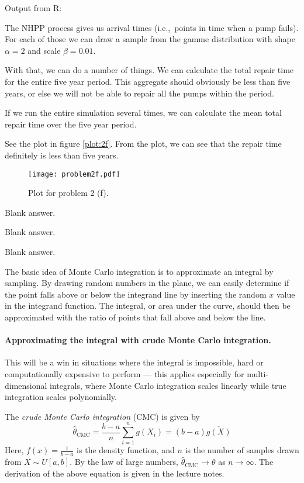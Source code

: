 \documentclass[a4paper,english,12pt]{article}
\begin{document}
Output from R:

The NHPP process gives us arrival times (i.e.,~points in time when a pump
fails). For each of those we can draw a sample from the gamme distribution with
shape $\alpha = 2$ and scale $\beta = 0.01$.

With that, we can do a number of things. We can calculate the total repair time
for the entire five year period. This aggregate should obviously be less than
five years, or else we will not be able to repair all the pumps within the
period.

If we run the entire simulation several times, we can calculate the mean total
repair time over the five year period.

See the plot in figure \vref{plot:2f}. From the plot, we can see that the
repair time definitely is less than five years.

\begin{figure}
  \centering
  \texttt{[image: problem2f.pdf]}
  \caption{Plot for problem 2 (f).}
  \label{plot:2f}
\end{figure}

Blank answer.

Blank answer.

Blank answer.

\clearpage
{}
The basic idea of Monte Carlo integration is to approximate an integral by
sampling. By drawing random numbers in the plane, we can easily determine if
the point falls above or below the integrand line by inserting the random $x$
value in the integrand function. The integral, or area under the curve, should
then be approximated with the ratio of points that fall above and below the
line.

\paragraph{Approximating the integral with crude Monte Carlo integration.}

This will be a win in situations where the integral is impossible, hard or
computationally expensive to perform --- this applies especially for
multi-dimensional integrals, where Monte Carlo integration scales linearly
while true integration scales polynomially.

The \textit{crude Monte Carlo integration} (CMC) is given by
\[
  \hat{\theta}_{\textrm{CMC}} = \frac{b-a}{n} \sum_{i=1}^{n} g(X_i) =
  (b-a)\overline{g(X)}
\]
Here, $f(x) = \frac{1}{b-a}$ is the density function, and $n$ is the number of
samples drawn from $X \sim U[a,b]$. By the law of large numbers,
$\hat{\theta}_{\textrm{CMC}} \to \theta$ as $n \to \infty$. The derivation of the above
equation is given in the lecture notes.
\end{document}
